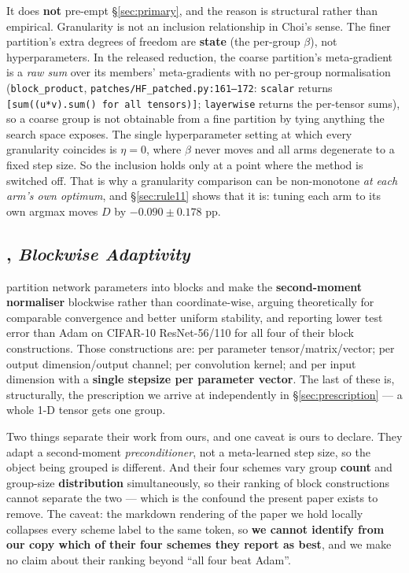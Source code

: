 \documentclass[10pt,letterpaper]{article}
\newcommand{\Dstat}{D}                         %
\newcommand{\arm}[1]{\texttt{#1}}
\begin{document}
It does \textbf{not} pre-empt \S\ref{sec:primary}, and the reason is structural rather than
empirical. Granularity is not an inclusion relationship in Choi's sense. The finer partition's
extra degrees of freedom are \textbf{state} (the per-group $\beta$), not hyperparameters. In
the released reduction, the coarse partition's meta-gradient is a \emph{raw sum} over its
members' meta-gradients with no per-group normalisation (\texttt{block\_product},
\texttt{patches/HF\_patched.py:161--172}: \arm{scalar} returns
\texttt{[sum((u*v).sum() for all tensors)]}; \arm{layerwise} returns the per-tensor sums), so a
coarse group is not obtainable from a fine partition by tying anything the search space
exposes. The single hyperparameter setting at which every granularity coincides is $\eta = 0$,
where $\beta$ never moves and all arms degenerate to a fixed step size. So the inclusion holds
only at a point where the method is switched off. That is why a granularity comparison can be
non-monotone \emph{at each arm's own optimum}, and \S\ref{sec:rule11} shows that it is: tuning
each arm to its own argmax moves $\Dstat$ by $-0.090 \pm 0.178$ pp.

\subsection{\citet{zheng2019blockwise}, \emph{Blockwise Adaptivity}}
\label{sec:rw-zheng}

\citet{zheng2019blockwise} partition network parameters into blocks and make the
\textbf{second-moment normaliser} blockwise rather than coordinate-wise, arguing theoretically
for comparable convergence and better uniform stability, and reporting lower test error than
Adam \citep{kingma2015adam} on CIFAR-10 ResNet-56/110 for all four of their block
constructions. Those constructions are: per parameter tensor/matrix/vector; per output
dimension/output channel; per convolution kernel; and per input dimension with a \textbf{single
stepsize per parameter vector}. The last of these is, structurally, the prescription we arrive
at independently in \S\ref{sec:prescription} --- a whole 1-D tensor gets one group.

Two things separate their work from ours, and one caveat is ours to declare. They adapt a
second-moment \emph{preconditioner}, not a meta-learned step size, so the object being grouped
is different. And their four schemes vary group \textbf{count} and group-size
\textbf{distribution} simultaneously, so their ranking of block constructions cannot separate
the two --- which is the confound the present paper exists to remove. The caveat: the markdown
rendering of the paper we hold locally collapses every scheme label to the same token, so
\textbf{we cannot identify from our copy which of their four schemes they report as best}, and
we make no claim about their ranking beyond ``all four beat Adam''.
\end{document}
